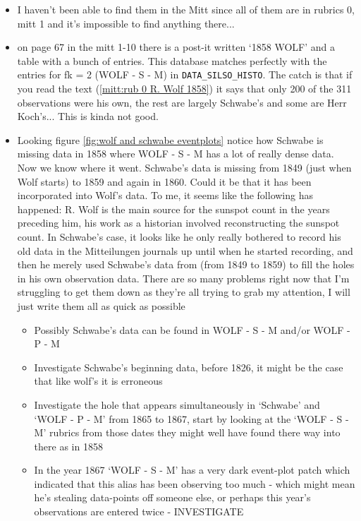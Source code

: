 \documentclass[12pt]{article}
\begin{document}
\begin{itemize}
    \item I haven't been able to find them in the Mitt since all of them are in rubrics 0, mitt 1 and it's impossible to find anything there...
    \item on page 67 in the mitt 1-10 there is a post-it written `1858 WOLF' and a table with a bunch of entries. This database matches perfectly with the entries for fk = 2 (WOLF - S - M) in \texttt{DATA\_SILSO\_HISTO}. The catch is that if you read the text (\ref{mitt:rub 0 R. Wolf 1858}) it says that only 200 of the 311 observations were his own, the rest are largely Schwabe's and some are Herr Koch's... This is kinda not good.
    \item Looking figure \ref{fig:wolf and schwabe eventplots} notice how Schwabe is missing data in 1858 where WOLF - S - M has a lot of really dense data. Now we know where it went. Schwabe's data is missing from 1849 (just when Wolf starts) to 1859 and again in 1860. Could it be that it has been incorporated into Wolf's data. To me, it seems like the following has happened: R. Wolf is the main source for the sunspot count in the years preceding him, his work as a historian involved reconstructing the sunspot count. In Schwabe's case, it looks like he only really bothered to record his old data in the Mitteilungen journals up until when he started recording, and then he merely used Schwabe's data from (from 1849 to 1859) to fill the holes in his own observation data. There are so many problems right now that I'm struggling to get them down as they're all trying to grab my attention, I will just write them all as quick as possible
    \begin{itemize}
        \item Possibly Schwabe's data can be found in WOLF - S - M and/or WOLF - P - M
        \item Investigate Schwabe's beginning data, before 1826, it might be the case that like wolf's it is erroneous
        \item Investigate the hole that appears simultaneously in `Schwabe' and `WOLF - P - M' from 1865 to 1867, start by looking at the `WOLF - S - M' rubrics from those dates they might well have found there way into there as in 1858
        \item In the year 1867 `WOLF - S - M' has a very dark event-plot patch which indicated that this alias has been observing too much - which might mean he's stealing data-points off someone else, or perhaps this year's observations are entered twice - INVESTIGATE
    \end{itemize}

\end{itemize}
\end{document}
